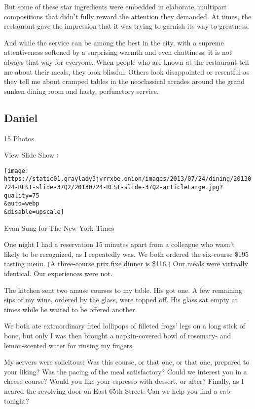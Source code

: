But some of these star ingredients were embedded in elaborate, multipart
compositions that didn't fully reward the attention they demanded. At
times, the restaurant gave the impression that it was trying to garnish
its way to greatness.

And while the service can be among the best in the city, with a supreme
attentiveness softened by a surprising warmth and even chattiness, it is
not always that way for everyone. When people who are known at the
restaurant tell me about their meals, they look blissful. Others look
disappointed or resentful as they tell me about cramped tables in the
neoclassical arcades around the grand sunken dining room and hasty,
perfunctory service.

\href{https://www.nytimes3xbfgragh.onion/slideshow/2013/07/24/dining/20130724-REST.html}{}

\hypertarget{daniel}{%
\subsection{Daniel}\label{daniel}}

15 Photos

View Slide Show ›

\texttt{[image: https://static01.graylady3jvrrxbe.onion/images/2013/07/24/dining/20130724-REST-slide-37Q2/20130724-REST-slide-37Q2-articleLarge.jpg?quality=75\\\&auto=webp\\\&disable=upscale]}

Evan Sung for The New York Times

One night I had a reservation 15 minutes apart from a colleague who
wasn't likely to be recognized, as I repeatedly was. We both ordered the
six-course \$195 tasting menu. (A three-course prix fixe dinner is
\$116.) Our meals were virtually identical. Our experiences were not.

The kitchen sent two amuse courses to my table. His got one. A few
remaining sips of my wine, ordered by the glass, were topped off. His
glass sat empty at times while he waited to be offered another.

We both ate extraordinary fried lollipops of filleted frogs' legs on a
long stick of bone, but only I was then brought a napkin-covered bowl of
rosemary- and lemon-scented water for rinsing my fingers.

My servers were solicitous: Was this course, or that one, or that one,
prepared to your liking? Was the pacing of the meal satisfactory? Could
we interest you in a cheese course? Would you like your espresso with
dessert, or after? Finally, as I neared the revolving door on East 65th
Street: Can we help you find a cab tonight?

